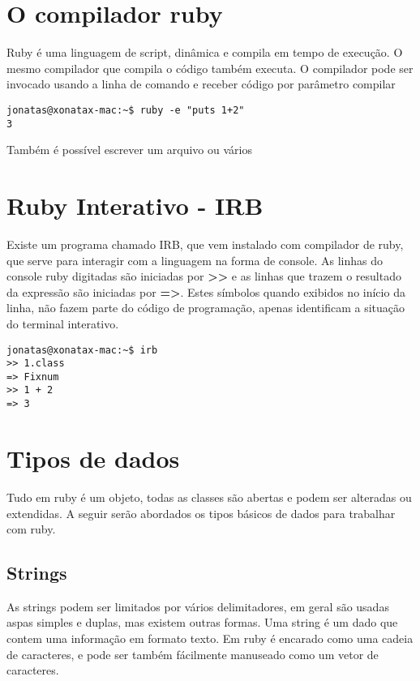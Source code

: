 \documentclass[espaco=simples,appendix=Name]{abnt}
\begin{document}
\section { O compilador ruby }

Ruby é uma linguagem de script, dinâmica e compila em tempo de execução. O mesmo compilador que compila o código também executa. O compilador pode ser invocado usando a linha de comando e receber código por parâmetro compilar

\begin{lstlisting}[caption=Usando o compilador na linha de comando]
jonatas@xonatax-mac:~$ ruby -e "puts 1+2"
3
\end{lstlisting}

Também é possível escrever um arquivo ou vários

\section { Ruby Interativo - IRB }

Existe um programa chamado IRB, que vem instalado com compilador de ruby, que serve para interagir com a linguagem na forma de console. As linhas do console ruby digitadas são iniciadas por \textbf{>>} e as linhas que trazem o resultado da expressão são iniciadas por \textbf{=>}. Estes símbolos quando exibidos no início da linha, não fazem parte do código de programação, apenas identificam a situação do terminal interativo.

\begin{lstlisting}[caption=Usando o compilador na linha de comando]
jonatas@xonatax-mac:~$ irb
>> 1.class
=> Fixnum
>> 1 + 2
=> 3
\end{lstlisting}

\section { Tipos de dados }

Tudo em ruby é um objeto, todas as classes são abertas e podem ser alteradas ou extendidas. A seguir serão abordados os tipos básicos de dados para trabalhar com ruby.

\subsection { Strings }

As strings podem ser limitados por vários delimitadores, em geral são usadas aspas simples e duplas, mas existem outras formas. Uma string é um dado que contem uma informação em formato texto. Em ruby é encarado como uma cadeia de caracteres, e pode ser também fácilmente manuseado como um vetor de caracteres.
\end{document}
